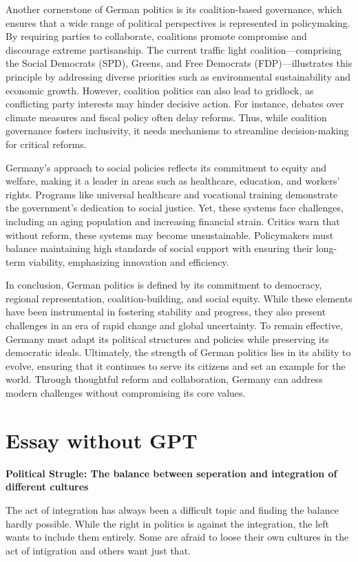 \documentclass{article}
\begin{document}
Another cornerstone of German politics is its coalition-based governance, which ensures that a wide range of political perspectives is represented in policymaking. By requiring parties to collaborate, coalitions promote compromise and discourage extreme partisanship. The current traffic light coalition—comprising the Social Democrats (SPD), Greens, and Free Democrats (FDP)—illustrates this principle by addressing diverse priorities such as environmental sustainability and economic growth. However, coalition politics can also lead to gridlock, as conflicting party interests may hinder decisive action. For instance, debates over climate measures and fiscal policy often delay reforms. Thus, while coalition governance fosters inclusivity, it needs mechanisms to streamline decision-making for critical reforms.

Germany's approach to social policies reflects its commitment to equity and welfare, making it a leader in areas such as healthcare, education, and workers’ rights. Programs like universal healthcare and vocational training demonstrate the government’s dedication to social justice. Yet, these systems face challenges, including an aging population and increasing financial strain. Critics warn that without reform, these systems may become unsustainable. Policymakers must balance maintaining high standards of social support with ensuring their long-term viability, emphasizing innovation and efficiency.

In conclusion, German politics is defined by its commitment to democracy, regional representation, coalition-building, and social equity. While these elements have been instrumental in fostering stability and progress, they also present challenges in an era of rapid change and global uncertainty. To remain effective, Germany must adapt its political structures and policies while preserving its democratic ideals. Ultimately, the strength of German politics lies in its ability to evolve, ensuring that it continues to serve its citizens and set an example for the world. Through thoughtful reform and collaboration, Germany can address modern challenges without compromising its core values.

\newpage
\section{Essay without GPT}
\textbf{Political Strugle: The balance between seperation and integration of different cultures}

The act of integration has always been a difficult topic and finding the balance hardly possible. While the right in politics is against the integration, the left wants to include them entirely. Some are afraid to loose their own cultures in the act of intigration and others want just that.
\end{document}
